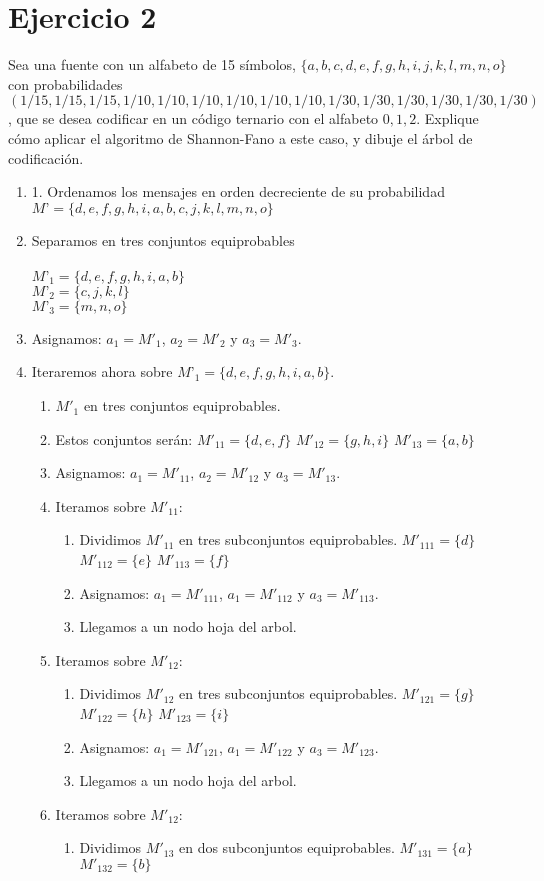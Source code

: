 \documentclass[12pt,a4paper]{article}
\begin{document}
	\section{Ejercicio 2}{Sea una fuente con un alfabeto de 15 símbolos, $\{a, b, c, d, e, f, g, h, i, j, k, l, m, n, o\}$ con probabilidades $(1/15, 1/15, 1/15, 1/10, 1/10, 1/10, 1/10, 1/10, 1/10, 1/30, 1/30, 1/30, 1/30, 1/30, 1/30)$, que se desea codificar en un código ternario con el alfabeto ${0, 1, 2}$. Explique cómo aplicar el algoritmo de Shannon-Fano a este caso, y dibuje el árbol de codificación. }
	\begin{enumerate}
		\item 1. Ordenamos los mensajes en orden decreciente de su probabilidad
		\\$ M’=\{d,e,f,g,h,i,a,b,c,j,k,l,m,n,o\}$
		\item Separamos en tres conjuntos equiprobables\\
		\\$ M’_1=\{d,e,f,g,h,i,a,b\}$
		\\$ M’_2=\{c,j,k,l\}$
		\\$ M’_3=\{m,n,o\}$
		\item Asignamos:
		$a_1 = M'_1$, $a_2=M'_2$ y $a_3=M'_3$.
		\item Iteraremos ahora sobre $M’_1=\{d,e,f,g,h,i,a,b\}$.
		 \begin{enumerate}
		 	\item $M'_1$ en tres conjuntos equiprobables.
		 	\item Estos conjuntos serán:
		 	$M'_{11} = \{d,e,f\} $
		 	$M'_{12} = \{g,h,i\} $
		 	$M'_{13} = \{a,b\}$		 	
		 	\item Asignamos:
		 			$a_1 = M'_{11}$, $a_2=M'_{12}$ y $a_3=M'_{13}$.
		 	\item Iteramos sobre $M'_11$:
		 	\begin{enumerate}
				\item Dividimos  $M'_11$ en tres subconjuntos equiprobables.
			 	$M'_{111} = \{d\} $
				$M'_{112} = \{e\} $
				$M'_{113} = \{f\}$
				\item Asignamos:
				$a_1 = M'_{111}$, $a_1=M'_{112}$ y $a_3=M'_{113}$.
				\item Llegamos a un nodo hoja del arbol.
		 	\end{enumerate}
	 		\item Iteramos sobre $M'_12$:
	 		\begin{enumerate}
	 			\item Dividimos  $M'_12$ en tres subconjuntos equiprobables.
	 			$M'_{121} = \{g\} $
	 			$M'_{122} = \{h\} $
	 			$M'_{123} = \{i\}$
	 			\item Asignamos:
	 			$a_1 = M'_{121}$, $a_1=M'_{122}$ y $a_3=M'_{123}$.
	 			\item Llegamos a un nodo hoja del arbol.
	 		\end{enumerate}
 			\item Iteramos sobre $M'_12$:
 		\begin{enumerate}
 			\item Dividimos  $M'_13$ en dos subconjuntos equiprobables.
 			$M'_{131} = \{a\} $
 			$M'_{132} = \{b\} $


\end{enumerate}
\end{enumerate}
\end{enumerate}
\end{document}
